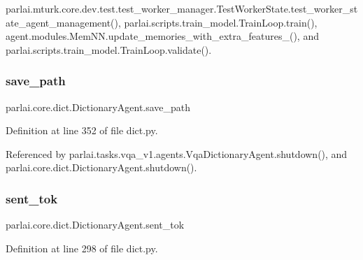parlai.\+mturk.\+core.\+dev.\+test.\+test\+\_\+worker\+\_\+manager.\+Test\+Worker\+State.\+test\+\_\+worker\+\_\+state\+\_\+agent\+\_\+management(), parlai.\+scripts.\+train\+\_\+model.\+Train\+Loop.\+train(), agent.\+modules.\+Mem\+N\+N.\+update\+\_\+memories\+\_\+with\+\_\+extra\+\_\+features\+\_\+(), and parlai.\+scripts.\+train\+\_\+model.\+Train\+Loop.\+validate().

\mbox{\label{classparlai_1_1core_1_1dict_1_1DictionaryAgent_a98faac965437d58fd2bf59f9d1438272}} 
\subsubsection{\texorpdfstring{save\+\_\+path}{save\_path}}
{\footnotesize\ttfamily parlai.\+core.\+dict.\+Dictionary\+Agent.\+save\+\_\+path}



Definition at line 352 of file dict.\+py.



Referenced by parlai.\+tasks.\+vqa\+\_\+v1.\+agents.\+Vqa\+Dictionary\+Agent.\+shutdown(), and parlai.\+core.\+dict.\+Dictionary\+Agent.\+shutdown().

\mbox{\label{classparlai_1_1core_1_1dict_1_1DictionaryAgent_ad883df8ef1d397ea93dd9d018822720e}} 
\subsubsection{\texorpdfstring{sent\+\_\+tok}{sent\_tok}}
{\footnotesize\ttfamily parlai.\+core.\+dict.\+Dictionary\+Agent.\+sent\+\_\+tok}



Definition at line 298 of file dict.\+py.



